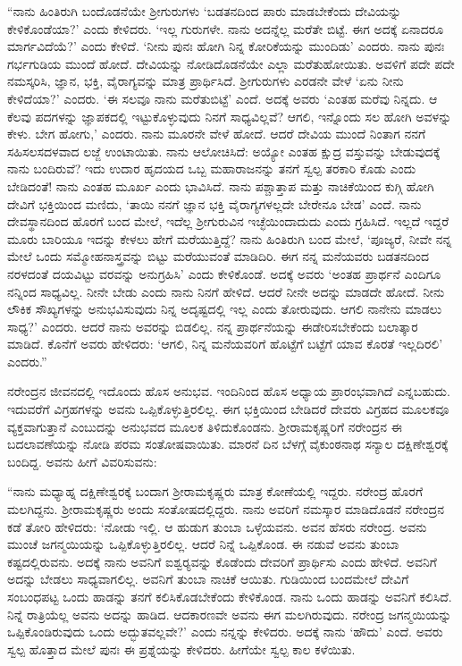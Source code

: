 “ನಾನು ಹಿಂತಿರುಗಿ ಬಂದೊಡನೆಯೇ ಶ‍್ರೀಗುರುಗಳು ‘ಬಡತನದಿಂದ ಪಾರು ಮಾಡಬೇಕೆಂದು ದೇವಿಯನ್ನು ಕೇಳಿಕೊಂಡೆಯಾ?’ ಎಂದು ಕೇಳಿದರು. ‘ಇಲ್ಲ ಗುರುಗಳೇ. ನಾನು ಅದನ್ನೆಲ್ಲ ಮರೆತೇ ಬಿಟ್ಟೆ. ಈಗ ಅದಕ್ಕೆ ಏನಾದರೂ ಮಾರ್ಗವಿದೆಯೆ?’ ಎಂದು ಕೇಳಿದೆ. ‘ನೀನು ಪುನಃ ಹೋಗಿ ನಿನ್ನ ಕೋರಿಕೆಯನ್ನು ಮುಂದಿಡು’ ಎಂದರು. ನಾನು ಪುನಃ ಗರ್ಭಗುಡಿಯ ಮುಂದೆ ಹೋದೆ. ದೇವಿಯನ್ನು ನೋಡಿದೊಡನೆಯೇ ಎಲ್ಲಾ ಮರೆತುಹೋಯಿತು. ಅವಳಿಗೆ ಪದೇ ಪದೇ ನಮಸ್ಕರಿಸಿ, ಜ್ಞಾನ, ಭಕ್ತಿ, ವೈರಾಗ್ಯವನ್ನು ಮಾತ್ರ ಪ್ರಾರ್ಥಿಸಿದೆ. ಶ‍್ರೀಗುರುಗಳು ಎರಡನೇ ವೇಳೆ ‘ಏನು ನೀನು ಕೇಳಿದೆಯಾ?’ ಎಂದರು. ‘ಈ ಸಲವೂ ನಾನು ಮರೆತುಬಿಟ್ಟೆ’ ಎಂದೆ. ಅದಕ್ಕೆ ಅವರು ‘ಎಂತಹ ಮರೆವು ನಿನ್ನದು. ಆ ಕೆಲವು ಪದಗಳನ್ನು ಜ್ಞಾಪಕದಲ್ಲಿ ಇಟ್ಟುಕೊಳ್ಳುವುದು ನಿನಗೆ ಸಾಧ್ಯವಿಲ್ಲವೆ? ಆಗಲಿ, ಇನ್ನೊಂದು ಸಲ ಹೋಗಿ ಅವಳನ್ನು ಕೇಳು. ಬೇಗ ಹೋಗು,’ ಎಂದರು. ನಾನು ಮೂರನೇ ವೇಳೆ ಹೋದೆ. ಆದರೆ ದೇವಿಯ ಮುಂದೆ ನಿಂತಾಗ ನನಗೆ ಸಹಿಸಲಸದಳವಾದ ಲಜ್ಜೆ ಉಂಟಾಯಿತು. ನಾನು ಆಲೋಚಿಸಿದೆ: ಅಯ್ಯೋ ಎಂತಹ ಕ್ಷುದ್ರ ವಸ್ತುವನ್ನು ಬೇಡುವುದಕ್ಕೆ ನಾನು ಬಂದಿರುವೆ? ಇದು ಉದಾರ ಹೃದಯದ ಒಬ್ಬ ಮಹಾರಾಜನನ್ನು ತನಗೆ ಸ್ವಲ್ಪ ತರಕಾರಿ ಕೊಡು ಎಂದು ಬೇಡಿದಂತೆ! ನಾನು ಎಂತಹ ಮೂರ್ಖ ಎಂದು ಭಾವಿಸಿದೆ. ನಾನು ಪಶ್ಚಾತ್ತಾಪ ಮತ್ತು ನಾಚಿಕೆಯಿಂದ ಕುಗ್ಗಿ ಹೋಗಿ ದೇವಿಗೆ ಭಕ್ತಿಯಿಂದ ಮಣಿದು, ‘ತಾಯಿ ನನಗೆ ಜ್ಞಾನ ಭಕ್ತಿ ವೈರಾಗ್ಯಗಳಲ್ಲದೇ ಬೇರೇನೂ ಬೇಡ’ ಎಂದೆ. ನಾನು ದೇವಸ್ಥಾನದಿಂದ ಹೊರಗೆ ಬಂದ ಮೇಲೆ, ಇದೆಲ್ಲ ಶ‍್ರೀಗುರುವಿನ ಇಚ್ಛೆಯಿಂದಾದುದು ಎಂದು ಗ್ರಹಿಸಿದೆ. ಇಲ್ಲದೆ ಇದ್ದರೆ ಮೂರು ಬಾರಿಯೂ ಇದನ್ನು ಕೇಳಲು ಹೇಗೆ ಮರೆಯುತ್ತಿದ್ದೆ? ನಾನು ಹಿಂತಿರುಗಿ ಬಂದ ಮೇಲೆ, ‘ಪೂಜ್ಯರೆ, ನೀವೇ ನನ್ನ ಮೇಲೆ ಒಂದು ಸಮ್ಮೋಹನಾಸ್ತ್ರವನ್ನು ಬಿಟ್ಟು ಮರೆಯುವಂತೆ ಮಾಡಿದಿರಿ. ಈಗ ನನ್ನ ಮನೆಯವರು ಬಡತನದಿಂದ ನರಳದಂತೆ ದಯವಿಟ್ಟು ವರವನ್ನು ಅನುಗ್ರಹಿಸಿ’ ಎಂದು ಕೇಳಿಕೊಂಡೆ. ಅದಕ್ಕೆ ಅವರು ‘ಅಂತಹ ಪ್ರಾರ್ಥನೆ ಎಂದಿಗೂ ನನ್ನಿಂದ ಸಾಧ್ಯವಿಲ್ಲ. ನೀನೇ ಬೇಡು ಎಂದು ನಾನು ನಿನಗೆ ಹೇಳಿದೆ. ಆದರೆ ನೀನೇ ಅದನ್ನು ಮಾಡದೇ ಹೋದೆ. ನೀನು ಲೌಕಿಕ ಸೌಖ್ಯಗಳನ್ನು ಅನುಭವಿಸುವುದು ನಿನ್ನ ಅದೃಷ್ಟದಲ್ಲಿ ಇಲ್ಲ ಎಂದು ತೋರುವುದು. ಆಗಲಿ ನಾನೇನು ಮಾಡಲು ಸಾಧ್ಯ?’ ಎಂದರು. ಆದರೆ ನಾನು ಅವರನ್ನು ಬಿಡಲಿಲ್ಲ. ನನ್ನ ಪ್ರಾರ್ಥನೆಯನ್ನು ಈಡೇರಿಸಬೇಕೆಂದು ಬಲಾತ್ಕಾರ ಮಾಡಿದೆ. ಕೊನೆಗೆ ಅವರು ಹೇಳಿದರು: ‘ಆಗಲಿ, ನಿನ್ನ ಮನೆಯವರಿಗೆ ಹೊಟ್ಟೆಗೆ ಬಟ್ಟೆಗೆ ಯಾವ ಕೊರತೆ ಇಲ್ಲದಿರಲಿ’ ಎಂದರು.”

ನರೇಂದ್ರನ ಜೀವನದಲ್ಲಿ ಇದೊಂದು ಹೊಸ ಅನುಭವ. ಇಂದಿನಿಂದ ಹೊಸ ಅಧ್ಯಾಯ ಪ್ರಾರಂಭವಾಗಿದೆ ಎನ್ನಬಹುದು. ಇದುವರೆಗೆ ವಿಗ್ರಹಗಳನ್ನು ಅವನು ಒಪ್ಪಿಕೊಳ್ಳುತ್ತಿರಲಿಲ್ಲ. ಈಗ ಭಕ್ತಿಯಿಂದ ಬೇಡಿದರೆ ದೇವರು ವಿಗ್ರಹದ ಮೂಲಕವೂ ವ್ಯಕ್ತವಾಗುತ್ತಾನೆ ಎಂಬುದನ್ನು ಅನುಭವದ ಮೂಲಕ ತಿಳಿದುಕೊಂಡನು. ಶ‍್ರೀರಾಮಕೃಷ್ಣರಿಗೆ ನರೇಂದ್ರನ ಈ ಬದಲಾವಣೆಯನ್ನು ನೋಡಿ ಪರಮ ಸಂತೋಷವಾಯಿತು. ಮಾರನೆ ದಿನ ಬೆಳಗ್ಗೆ ವೈಕುಂಠನಾಥ ಸನ್ಯಾಲ ದಕ್ಷಿಣೇಶ್ವರಕ್ಕೆ ಬಂದಿದ್ದ. ಅವನು ಹೀಗೆ ವಿವರಿಸುವನು:

“ನಾನು ಮಧ್ಯಾಹ್ನ ದಕ್ಷಿಣೇಶ್ವರಕ್ಕೆ ಬಂದಾಗ ಶ‍್ರೀರಾಮಕೃಷ್ಣರು ಮಾತ್ರ ಕೋಣೆಯಲ್ಲಿ ಇದ್ದರು. ನರೇಂದ್ರ ಹೊರಗೆ ಮಲಗಿದ್ದನು. ಶ‍್ರೀರಾಮಕೃಷ್ಣರು ಅಂದು ಸಂತೋಷದಲ್ಲಿದ್ದರು. ನಾನು ಅವರಿಗೆ ನಮಸ್ಕಾರ ಮಾಡಿದೊಡನೆ ನರೇಂದ್ರನ ಕಡೆ ತೋರಿ ಹೇಳಿದರು: ‘ನೋಡು ಇಲ್ಲಿ. ಆ ಹುಡುಗ ತುಂಬಾ ಒಳ್ಳೆಯವನು. ಅವನ ಹೆಸರು ನರೇಂದ್ರ. ಅವನು ಮುಂಚೆ ಜಗನ್ಮಯಿಯನ್ನು ಒಪ್ಪಿಕೊಳ್ಳುತ್ತಿರಲಿಲ್ಲ. ಆದರೆ ನಿನ್ನೆ ಒಪ್ಪಿಕೊಂಡ. ಈ ನಡುವೆ ಅವನು ತುಂಬಾ ಕಷ್ಟದಲ್ಲಿರುವನು. ಅದಕ್ಕೆ ನಾನು ಅವನಿಗೆ ಐಶ್ವರ‍್ಯವನ್ನು ಕೊಡೆಂದು ದೇವರಿಗೆ ಪ್ರಾರ್ಥಿಸು ಎಂದು ಹೇಳಿದೆ. ಅವನಿಗೆ ಅದನ್ನು ಬೇಡಲು ಸಾಧ್ಯವಾಗಲಿಲ್ಲ. ಅವನಿಗೆ ತುಂಬಾ ನಾಚಿಕೆ ಆಯಿತು. ಗುಡಿಯಿಂದ ಬಂದಮೇಲೆ ದೇವಿಗೆ ಸಂಬಂಧಪಟ್ಟ ಒಂದು ಹಾಡನ್ನು ತನಗೆ ಕಲಿಸಿಕೊಡಬೇಕೆಂದು ಕೇಳಿಕೊಂಡ. ನಾನು ಒಂದು ಹಾಡನ್ನು ಅವನಿಗೆ ಕಲಿಸಿದೆ. ನಿನ್ನೆ ರಾತ್ರಿಯೆಲ್ಲ ಅವನು ಅದನ್ನು ಹಾಡಿದ. ಆದಕಾರಣವೇ ಅವನು ಈಗ ಮಲಗಿರುವುದು. ನರೇಂದ್ರ ಜಗನ್ಮಯಿಯನ್ನು ಒಪ್ಪಿಕೊಂಡಿರುವುದು ಒಂದು ಅದ್ಭುತವಲ್ಲವೇ?’ ಎಂದು ನನ್ನನ್ನು ಕೇಳಿದರು. ಅದಕ್ಕೆ ನಾನು ‘ಹೌದು’ ಎಂದೆ. ಅವರು ಸ್ವಲ್ಪ ಹೊತ್ತಾದ ಮೇಲೆ ಪುನಃ ಈ ಪ್ರಶ್ನೆಯನ್ನು ಕೇಳಿದರು. ಹೀಗೆಯೇ ಸ್ವಲ್ಪ ಕಾಲ ಕಳೆಯಿತು.

